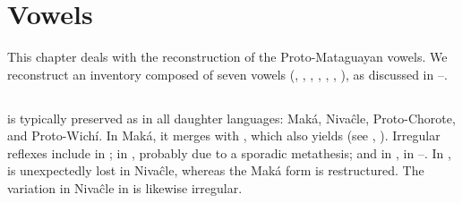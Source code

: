 \chapter{Vowels} \label{pm-vowels}
This chapter deals with the reconstruction of the Proto-Mataguayan vowels. We reconstruct an inventory composed of seven vowels (, , , , , , ), as discussed in –.

\section{}\label{pm-i}
 is typically preserved as  in all daughter languages: Maká, Nivaĉle, Proto-Chorote, and Proto-Wichí. In Maká, it merges with , which also yields  (see , ). Irregular reflexes include  in ;  in , probably due to a sporadic metathesis; and  in ,  in --. In ,  is unexpectedly lost in Nivaĉle, whereas the Maká form is restructured. The variation  \recind {} in Nivaĉle in  is likewise irregular.

\begin{exe}
    \ex \mouth
    \ex \gofirst
    \ex \stinger
    \ex \rightn \label{i-right}
    \ex \sisinlaw
    \ex \notafraid
    \ex \coldweather
    \ex \hidev
    \ex \crab
    \ex \leech
    \ex \palmg
    \ex \goawayit
    \ex \cryit
    \ex \resin
    \ex \plits
    \ex \dew
    \ex \wax
    \ex \water
    \ex \sandisaj
    \ex \truev
    \ex \neighbor
    \ex \elderbro \label{i-elderbro}
    \ex \eldersis
    \ex \youngerbro
    \ex \youngersis
    \ex \snail
    \ex \whitelim
    \ex \languageword
    \ex \thread
    \ex \savannahhawk
    \ex \rope
    \ex \smelln
    \ex \smellv
    \ex \pathn
    \ex \longv
    \ex \fillv \label{i-fillv}
    \ex \whitequebracho
    \ex \spend
    \ex \suckb \label{i-suckb}
    \ex \shoot
    \ex \spinsew
    \ex \carrysh
    \ex \swallow
    \ex \invite
    \ex \plate
    \ex \dig
    \ex \movev
    \ex \rheum
    \ex \woodpecker
    \ex \hornero
    \ex \bromelia \label{i-bromelia}
    \ex \blackalgarrobof \label{i-blackalgarrobof}
    \ex \blackalgarrobot \label{i-blackalgarrobot}
    \ex \rib
    \ex \recipient
    \ex \waspaniti
    \ex \juice
    \ex \dryout
    \ex \good
    \ex \firei
\end{exe}

